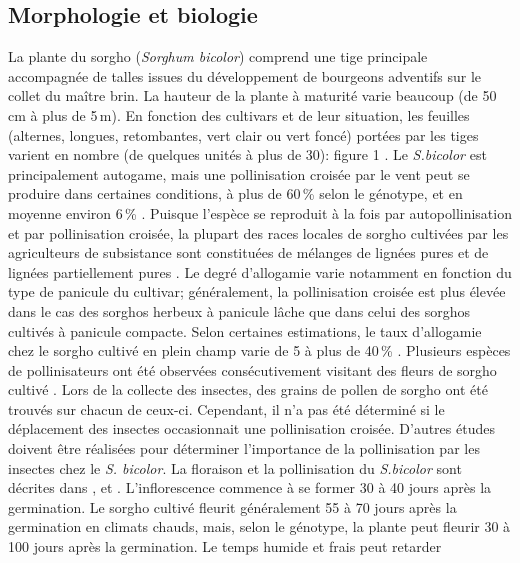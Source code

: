 \documentclass[a4paper,11pt]{article}
\begin{document}
\subsection{Morphologie et biologie} La plante du sorgho
(\emph{Sorghum bicolor}) comprend une tige principale accompagnée de
talles issues du développement de bourgeons adventifs sur le collet du
maître brin. La hauteur de la plante à maturité varie beaucoup (de
50\,cm à plus de 5\,m). En fonction des cultivars et de leur
situation, les feuilles (alternes, longues, retombantes, vert clair ou
vert foncé) portées par les tiges varient en nombre (de quelques
unités à plus de 30): figure 1 \cite{BARRO_KONDOMBO_2010}. Le
\emph{S.bicolor} est principalement autogame, mais une pollinisation
croisée par le vent peut se produire dans certaines conditions, à plus
de 60\,\% selon le génotype, et en moyenne environ 6\,\%
\cite{Ellstrand_1983, House85,Pedersen_1998,Schertz_1980}. Puisque
l'espèce se reproduit à la fois par autopollinisation et par
pollinisation croisée, la plupart des races locales de sorgho
cultivées par les agriculteurs de subsistance sont constituées de
mélanges de lignées pures et de lignées partiellement pures
\cite{SINGH_1997}. Le degré d'allogamie varie notamment en fonction du
type de panicule du cultivar; généralement, la pollinisation croisée
est plus élevée dans le cas des sorghos herbeux à panicule lâche que
dans celui des sorghos cultivés à panicule compacte. Selon certaines
estimations, le taux d'allogamie chez le sorgho cultivé en plein champ
varie de 5 à plus de 40\,\% \cite{Barnaud_2008, DJE_2004,
  Doggett_1988, Ellstrand_1983,Schmidt_2006}. Plusieurs espèces de
pollinisateurs ont été observées consécutivement visitant des fleurs
de sorgho cultivé \cite{Immelman_2000, Schmidt_2006}. Lors de la
collecte des insectes, des grains de pollen de sorgho ont été trouvés
sur chacun de ceux-ci. Cependant, il n'a pas été déterminé si le
déplacement des insectes occasionnait une pollinisation
croisée. D'autres études doivent être réalisées pour déterminer
l'importance de la pollinisation par les insectes chez le
\emph{S. bicolor}. La floraison et la pollinisation du
\emph{S.bicolor} sont décrites dans \citeauthor{House85}
\citeyear{House85}, \citeauthor{SINGH_1997} \citeyear{SINGH_1997} et
\citeauthor{SRINIVASA_2013} \citeyear{SRINIVASA_2013}. L'inflorescence
commence à se former 30 à 40 jours après la germination. Le sorgho
cultivé fleurit généralement 55 à 70 jours après la germination en
climats chauds, mais, selon le génotype, la plante peut fleurir 30 à
100 jours après la germination. Le temps humide et frais peut retarder
\end{document}
